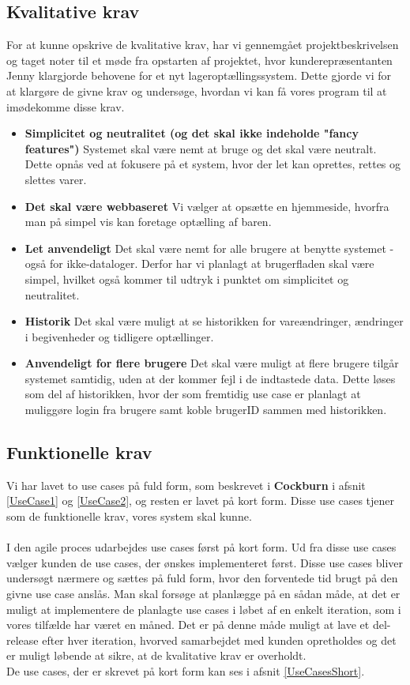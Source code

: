 \documentclass[]{article}
\begin{document}
\subsection{Kvalitative krav}
For at kunne opskrive de kvalitative krav, har vi gennemgået projektbeskrivelsen og taget noter til et møde fra opstarten af projektet, hvor kunderepræsentanten Jenny klargjorde behovene for et nyt lageroptællingssystem. Dette gjorde vi for at klargøre de givne krav og undersøge, hvordan vi kan få vores program til at imødekomme disse krav.
\begin{itemize}
 	\item \textbf{Simplicitet og neutralitet (og det skal ikke indeholde "fancy features")} Systemet skal være nemt at bruge og det skal være neutralt. Dette opnås ved at fokusere på et system, hvor der let kan oprettes, rettes og slettes varer.
 	\item \textbf{Det skal være webbaseret} Vi vælger at opsætte en hjemmeside, hvorfra man på simpel vis kan foretage optælling af baren.
 	\item \textbf{Let anvendeligt} Det skal være nemt for alle brugere at benytte systemet - også for ikke-dataloger. Derfor har vi planlagt at brugerfladen skal være simpel, hvilket også kommer til udtryk i punktet om simplicitet og neutralitet.
 	\item \textbf{Historik} Det skal være muligt at se historikken for vareændringer, ændringer i begivenheder og tidligere optællinger.
 	\item \textbf{Anvendeligt for flere brugere} Det skal være muligt at flere brugere tilgår systemet samtidig, uden at der kommer fejl i de indtastede data. Dette løses som del af historikken, hvor der som fremtidig use case er planlagt at muliggøre login fra brugere samt koble brugerID sammen med historikken.
\end{itemize}

\subsection{Funktionelle krav}
Vi har lavet to use cases på fuld form, som beskrevet i \textbf{Cockburn} \cite{cockburn1997structuring} i afsnit \ref{UseCase1} og \ref{UseCase2}, og resten er lavet på kort form. Disse use cases tjener som de funktionelle krav, vores system skal kunne. \\ \\
I den agile proces udarbejdes use cases først på kort form. Ud fra disse use cases vælger kunden de use cases, der ønskes implementeret først. Disse use cases bliver undersøgt nærmere og sættes på fuld form, hvor den forventede tid brugt på den givne use case anslås. Man skal forsøge at planlægge på en sådan måde, at det er muligt at implementere de planlagte use cases i løbet af en enkelt iteration, som i vores tilfælde har været en måned. Det er på denne måde muligt at lave et del-release efter hver iteration, hvorved samarbejdet med kunden opretholdes og det er muligt løbende at sikre, at de kvalitative krav er overholdt. \\
De use cases, der er skrevet på kort form kan ses i afsnit \ref{UseCasesShort}.
\end{document}
